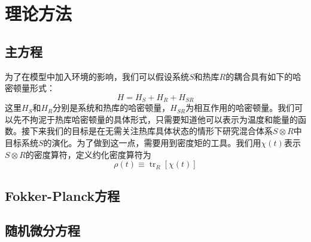 
\chapter{理论方法}
\label{ch3}

\section{主方程}
为了在模型中加入环境的影响，我们可以假设系统$S$和热库$R$的耦合具有如下的哈密顿量形式：
\begin{equation}
H=H_{S}+H_{R}+H_{S R}
\end{equation}
这里$H_{S}$和$H_{R}$分别是系统和热库的哈密顿量，$H_{SR}$为相互作用的哈密顿量。我们可以先不拘泥于热库哈密顿量的具体形式，只需要知道他可以表示为温度和能量的函数。接下来我们的目标是在无需关注热库具体状态的情形下研究混合体系$S \otimes R$中目标系统$S$的演化。为了做到这一点，需要用到密度矩的工具。我们用$\chi(t)$表示$S \otimes R$的密度算符，定义约化密度算符为
\begin{equation}
\rho(t) \equiv \operatorname{tr}_{R}[\chi(t)]
\end{equation}


\section{Fokker-Planck方程}


\section{随机微分方程}